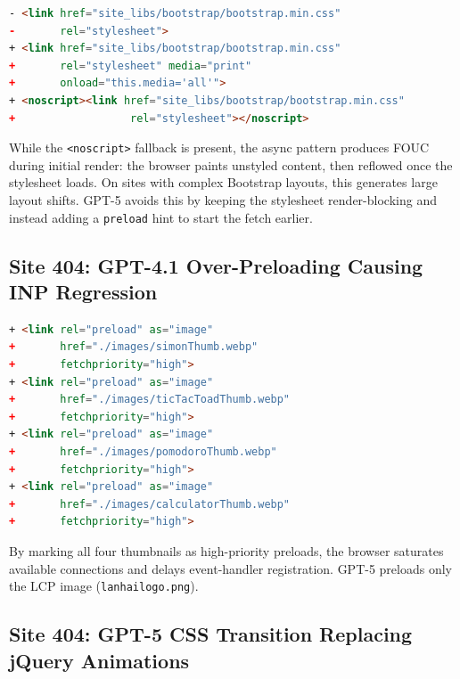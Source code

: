 \begin{lstlisting}[caption={Claude~Code patch for site 813 (excerpt). Converts stylesheets to async loading without FOUC protection, causing CLS~Desktop to rise from 0.094 to 1.08.},label={lst:cc-813},language=html,basicstyle=\ttfamily\footnotesize,breaklines=true]
- <link href="site_libs/bootstrap/bootstrap.min.css"
-       rel="stylesheet">
+ <link href="site_libs/bootstrap/bootstrap.min.css"
+       rel="stylesheet" media="print"
+       onload="this.media='all'">
+ <noscript><link href="site_libs/bootstrap/bootstrap.min.css"
+                  rel="stylesheet"></noscript>
\end{lstlisting}

While the \texttt{<noscript>} fallback is present, the async pattern produces FOUC during initial render: the browser paints unstyled content, then reflowed once the stylesheet loads. On sites with complex Bootstrap layouts, this generates large layout shifts. GPT-5 avoids this by keeping the stylesheet render-blocking and instead adding a \texttt{preload} hint to start the fetch earlier.

\subsection{Site 404: GPT-4.1 Over-Preloading Causing INP Regression}
\label{app:patch-404-gpt41}

\begin{lstlisting}[caption={GPT-4.1 patch for site 404 (excerpt). Preloads four images simultaneously with high priority, causing INP~Desktop to rise from 16\,ms to 752\,ms.},label={lst:gpt41-404},language=html,basicstyle=\ttfamily\footnotesize,breaklines=true]
+ <link rel="preload" as="image"
+       href="./images/simonThumb.webp"
+       fetchpriority="high">
+ <link rel="preload" as="image"
+       href="./images/ticTacToadThumb.webp"
+       fetchpriority="high">
+ <link rel="preload" as="image"
+       href="./images/pomodoroThumb.webp"
+       fetchpriority="high">
+ <link rel="preload" as="image"
+       href="./images/calculatorThumb.webp"
+       fetchpriority="high">
\end{lstlisting}

By marking all four thumbnails as high-priority preloads, the browser saturates available connections and delays event-handler registration. GPT-5 preloads only the LCP image (\texttt{lanhailogo.png}).

\subsection{Site 404: GPT-5 CSS Transition Replacing jQuery Animations}
\label{app:patch-404-gpt5}

